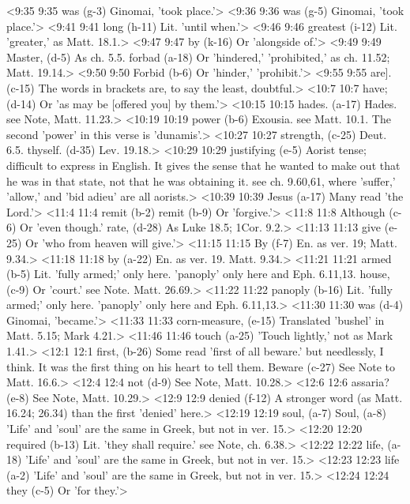 <9:35 9:35  was (g-3)  Ginomai, 'took place.'>
<9:36 9:36  was (g-5)  Ginomai, 'took place.'>
<9:41 9:41  long (h-11)  Lit. 'until when.'>
<9:46 9:46  greatest (i-12)  Lit. 'greater,' as Matt. 18.1.>
<9:47 9:47  by (k-16)  Or 'alongside of.'>
<9:49 9:49  Master, (d-5)  As ch. 5.5.
  forbad (a-18)  Or 'hindered,' 'prohibited,' as ch. 11.52; Matt. 19.14.>
<9:50 9:50  Forbid (b-6)  Or 'hinder,' 'prohibit.'>
<9:55 9:55  are]. (c-15)  The words in brackets are, to say the least, doubtful.>
<10:7 10:7  have; (d-14)  Or 'as may be [offered you] by them.'>
<10:15 10:15  hades. (a-17)  Hades. see Note, Matt. 11.23.>
<10:19 10:19  power (b-6)  Exousia. see Matt. 10.1. The second 'power' in this verse  is 'dunamis'.>
<10:27 10:27  strength, (c-25)  Deut. 6.5.
  thyself. (d-35)  Lev. 19.18.>
<10:29 10:29  justifying (e-5)  Aorist tense; difficult to express in English. It gives the  sense that he wanted to make out that he was in that state, not  that he was obtaining it. see ch. 9.60,61, where 'suffer,'  'allow,' and 'bid adieu' are all aorists.>
<10:39 10:39  Jesus (a-17)  Many read 'the Lord.'>
<11:4 11:4  remit (b-2)  remit (b-9)
  Or 'forgive.'>
<11:8 11:8  Although (c-6)  Or 'even though.'
  rate, (d-28)  As Luke 18.5; 1Cor. 9.2.>
<11:13 11:13  give (e-25)  Or 'who from heaven will give.'>
<11:15 11:15  By (f-7)  En. as ver. 19; Matt. 9.34.>
<11:18 11:18  by (a-22)  En. as ver. 19. Matt. 9.34.>
<11:21 11:21  armed (b-5) Lit. 'fully armed;' only here. 'panoply' only here and Eph. 6.11,13.
  house, (c-9)  Or 'court.' see Note. Matt. 26.69.>
<11:22 11:22  panoply (b-16)  Lit. 'fully armed;' only here. 'panoply' only here and Eph.  6.11,13.>
<11:30 11:30  was (d-4)  Ginomai, 'became.'>
<11:33 11:33  corn-measure, (e-15)  Translated 'bushel' in Matt. 5.15; Mark 4.21.>
<11:46 11:46  touch (a-25)  'Touch lightly,' not as Mark 1.41.>
<12:1 12:1  first, (b-26)  Some read 'first of all beware.' but needlessly, I think. It  was the first thing on his heart to tell them.
  Beware (c-27)  See Note to Matt. 16.6.>
<12:4 12:4  not (d-9)  See Note, Matt. 10.28.>
<12:6 12:6  assaria? (e-8)  See Note, Matt. 10.29.>
<12:9 12:9  denied (f-12)  A stronger word (as Matt. 16.24; 26.34) than the first  'denied' here.>
<12:19 12:19  soul, (a-7)  Soul, (a-8)
 'Life' and 'soul' are the same in Greek, but not in ver. 15.>
<12:20 12:20  required (b-13)  Lit. 'they shall require.' see Note, ch. 6.38.>
<12:22 12:22  life, (a-18) 'Life' and 'soul' are the same in Greek, but not in ver. 15.>
<12:23 12:23  life (a-2)  'Life' and 'soul' are the same in Greek, but not in ver. 15.>
<12:24 12:24  they (c-5)  Or 'for they.'>
